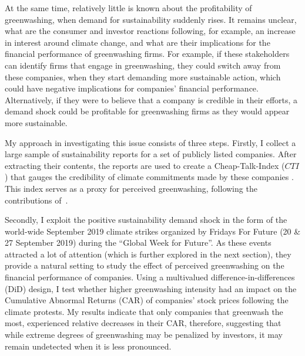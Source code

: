 \documentclass[12pt]{article}
\begin{document}
At the same time, relatively little is known about the profitability of greenwashing, when demand for sustainability suddenly rises. It remains unclear, what are the consumer and investor reactions following, for example, an increase in interest around climate change, and what are their implications for the financial performance of greenwashing firms. For example, if these stakeholders can identify firms that engage in greenwashing, they could switch away from these companies, when they start demanding more sustainable action, which could have negative implications for companies' financial performance. Alternatively, if they were to believe that a company is credible in their efforts, a demand shock could be profitable for greenwashing firms as they would appear more sustainable.  


My approach in investigating this issue consists of three steps. Firstly, I collect a large sample of sustainability reports for a set of publicly listed companies. After extracting their contents, the reports are used to create a Cheap-Talk-Index ($CTI$) that gauges the credibility of climate commitments made by these companies \parencite{binglerHowCheapTalk2024}. This index serves as a proxy for perceived greenwashing, following the contributions of~\cite{coenAreCorporateClimate2022}.

Secondly, I exploit the positive sustainability demand shock in the form of the world-wide September 2019 climate strikes organized by Fridays For Future (20 \& 27 September 2019) during the ``Global Week for Future''. As these events attracted a lot of attention (which is further explored in the next section), they provide a natural setting to study the effect of perceived greenwashing on the financial performance of companies. Using a multivalued difference-in-differences (DiD) design, I test whether higher greenwashing intensity had an impact on the Cumulative Abnormal Returns (CAR) of companies' stock prices following the climate protests. My results indicate that only companies that greenwash the most, experienced relative decreases in their CAR, therefore, suggesting that while extreme degrees of greenwashing may be penalized by investors, it may remain undetected when it is less pronounced.
\end{document}
